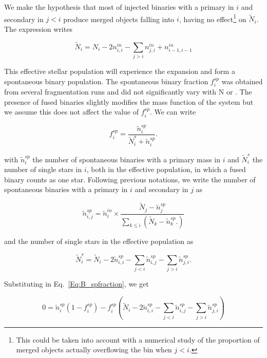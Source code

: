 We make the hypothesis that most of injected binaries with a primary in $i$ and secondary in $j<i$ produce merged objects falling into $i$, having no effect\footnote{This could be taken into account with a numerical study of the proportion of merged objects actually overflowing the bin when $j<i$.} on $\tilde{N}_i$. The expression writes

\begin{equation}
\tilde{N}_i = N_i - 2  n_{i,i}^{in} - \sum\limits_{j>i} n_{j,i}^{in} + n_{i-1,i-1}^{in}
\end{equation}


This effective stellar population will experience the \HubLem expansion and form a spontaneous binary population. The spontaneous binary fraction $f_i^{sp}$ was obtained from several \HubLem fragmentation runs and did not significantly vary with N or \tHub. The presence of fused binaries slightly modifies the mass function of the system but we assume this does not affect the value of $f_i^{sp}$. We can write

\begin{equation}
\label{Eq:B_spfraction}
f_i^{sp} = \frac{\tilde{n}_i^{sp}}{\tilde{N}_i^{s} + \tilde{n}_i^{sp}}.
\end{equation}

with $\tilde{n}_i^{sp}$ the number of spontaneous binaries with a primary mass in $i$ and $\tilde{N}_i^{s}$ the number of single stars in $i$, both in the effective population, in which a fused binary counts as one star. Following previous notations, we write the number of spontaneous binaries with a primary in $i$ and secondary in $j$ as

\begin{equation}
\tilde{n}_{i,j}^{sp} = \tilde{n}_i^{in} \times \frac{\tilde{N}_j - \tilde{n}_j^{sp} }{\sum\limits_{k\le i} \left( \tilde{N}_k - \tilde{n}_k^{sp}. \right) }
\end{equation}

and the number of single stars in the effective population as

\begin{equation}
\tilde{N}_i^{s} = \tilde{N}_i - 2  \tilde{n}_{i,i}^{sp} - \sum\limits_{j<i} \tilde{n}_{i,j}^{sp} - \sum\limits_{j>i} \tilde{n}_{j,i}^{sp}.
\end{equation}


Substituting in Eq.~\ref{Eq:B_spfraction}, we get


\begin{equation}
\label{Eq:B_spontaneous}
0 =  \tilde{n}_i^{sp} \left( 1 - f_i^{sp}\right) - f_i^{sp}\left( \tilde{N}_i - 2  \tilde{n}_{i,i}^{sp} - \sum\limits_{j<i} \tilde{n}_{i,j}^{sp} - \sum\limits_{j>i} \tilde{n}_{j,i}^{sp} \right)
\end{equation}

